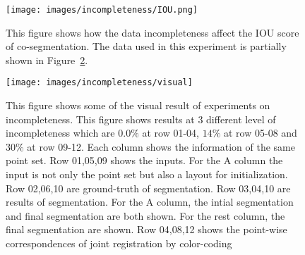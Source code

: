 \begin{figure}
	\centering
	\texttt{[image: images/incompleteness/IOU.png]}
	\caption{This figure shows how the data incompleteness affect the IOU score of co-segmentation. The data used in this experiment is partially shown in Figure~\ref{fig:incompleteness2}.}
	\label{fig:incompleteness}
\end{figure}
\begin{figure}
	\centering
	\texttt{[image: images/incompleteness/visual]}
	\caption{This figure shows some of the visual result of experiments on incompleteness. This figure shows results at 3 different level of incompleteness which are $0.0\%$ at row 01-04, $14\%$ at row 05-08 and  $30\%$ at row 09-12. Each column shows the information of the same point set. Row 01,05,09 shows the inputs. For the A column the input is not only the point set but also a layout for initialization. Row 02,06,10 are ground-truth of segmentation. Row 03,04,10 are results of segmentation. For the A column, the intial segmentation and final segmentation are both shown. For the rest column, the final segmentation are shown.
	Row 04,08,12 shows the point-wise correspondences of joint registration by color-coding}
	\label{fig:incompleteness2}
\end{figure}
